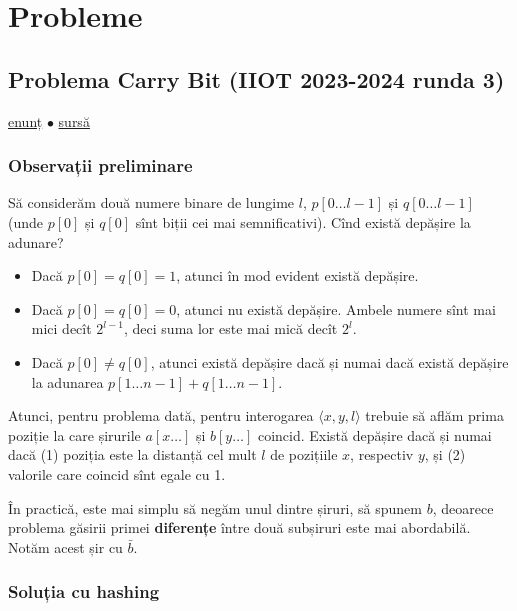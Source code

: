 \documentclass[../main.tex]{subfiles}
\begin{document}
\section{Probleme}

\subsection{Problema Carry Bit (IIOT 2023-2024 runda 3)}
\label{problem:carry-bit}

\href{https://kilonova.ro/problems/2165}{enunț}
$\bullet$
\hyperref[code:carry-bit]{sursă}

\subsubsection*{Observații preliminare}

Să considerăm două numere binare de lungime $l$, $p[0 \dots l-1]$ și $q[0 \dots l-1]$ (unde $p[0]$ și $q[0]$ sînt biții cei mai semnificativi). Cînd există depășire la adunare?

\begin{itemize}
  \item Dacă $p[0] = q[0] = 1$, atunci în mod evident există depășire.

  \item Dacă $p[0] = q[0] = 0$, atunci nu există depășire. Ambele numere sînt mai mici decît $2^{l-1}$, deci suma lor este mai mică decît $2^l$.

  \item Dacă $p[0] \neq q[0]$, atunci există depășire dacă și numai dacă există depășire la adunarea $p[1 \dots n-1] + q[1 \dots n-1]$.
\end{itemize}

Atunci, pentru problema dată, pentru interogarea $\langle x, y, l \rangle$ trebuie să aflăm prima poziție la care șirurile $a[x \dots]$ și $b[y \dots]$ coincid. Există depășire dacă și numai dacă (1) poziția este la distanță cel mult $l$ de pozițiile $x$, respectiv $y$, și (2) valorile care coincid sînt egale cu 1.

În practică, este mai simplu să negăm unul dintre șiruri, să spunem $b$, deoarece problema găsirii primei \textbf{diferențe} între două subșiruri este mai abordabilă. Notăm acest șir cu $\bar{b}$.

\subsubsection*{Soluția cu hashing}
\end{document}
